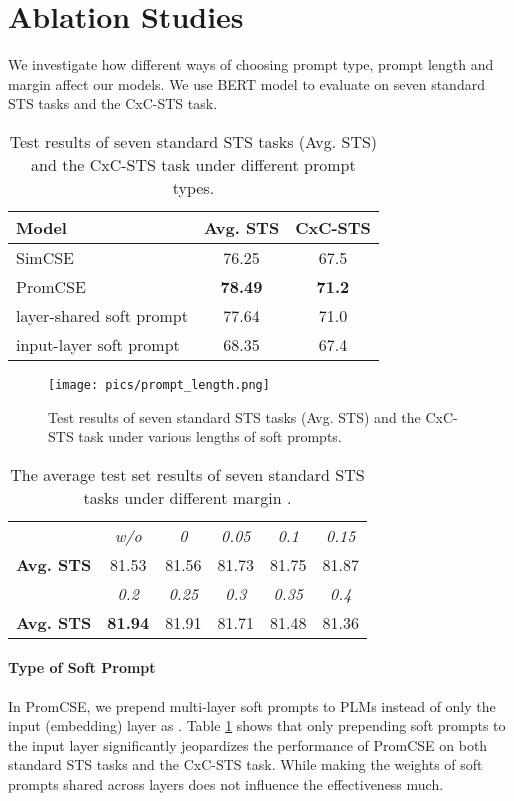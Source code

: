 \documentclass[11pt]{article}
\begin{document}
\section{Ablation Studies}
\label{sec: ablation}
We investigate how different ways of choosing prompt type, prompt length and margin  affect our models. We use BERT model to evaluate on seven standard STS tasks and the CxC-STS task.

\begin{table}[t]
\small
\centering
\begin{tabular}{lcc}
\toprule
\textbf{Model} &  \textbf{Avg. STS}  &  \textbf{CxC-STS}  \\
\midrule
SimCSE  & 76.25 & 67.5 \\
\midrule
PromCSE  & \textbf{78.49} & \textbf{71.2} \\
\quad  layer-shared soft prompt  & 77.64 & 71.0 \\
\quad  input-layer soft prompt & 68.35 & 67.4 \\
\bottomrule
\end{tabular}
\caption{\label{tab: prompt type}
Test results of seven standard STS tasks (Avg. STS) and the CxC-STS task under different prompt types.
}
\end{table}

\begin{figure}[htp]
	\centering 
	\texttt{[image: pics/prompt\_length.png]}
	\caption{Test results of seven standard STS tasks (Avg. STS) and the CxC-STS task under various lengths of soft prompts.}
	\label{fig: prompt length}
\end{figure}

\begin{table}[t]
\small
\centering
\begin{tabular}{lccccc}
\toprule
 & \textit{w/o} & \textit{0} & \textit{0.05} & \textit{0.1} & \textit{0.15}    \\
\textbf{Avg. STS} & 81.53 & 81.56 & 81.73 & 81.75 & 81.87 \\
\midrule
 & \textit{0.2} & \textit{0.25} & \textit{0.3} & \textit{0.35} & \textit{0.4}    \\
\textbf{Avg. STS} & \textbf{81.94} & 81.91 & 81.71 & 81.48 & 81.36 \\
\bottomrule
\end{tabular}
\caption{\label{tab: margin}
The average test set results of seven standard STS tasks under different margin .
}
\end{table}

\paragraph{Type of Soft Prompt}
In PromCSE, we prepend multi-layer soft prompts to PLMs instead of only the input (embedding) layer as \cite{Lester21sacle}. Table \ref{tab: prompt type} shows that only prepending soft prompts to the input layer significantly jeopardizes the performance of PromCSE on both standard STS tasks and the CxC-STS task. While making the weights of soft prompts shared across layers does not influence the effectiveness much.
\end{document}
